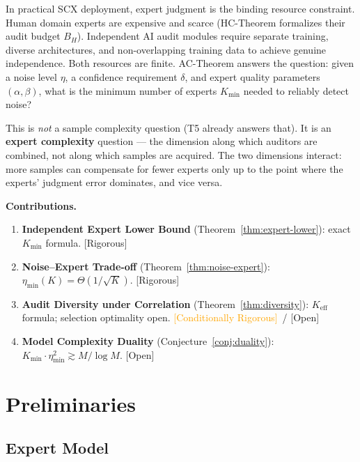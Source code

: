 \documentclass[12pt,a4paper]{article}
\newcommand{\rigorous}{\textcolor{green!50!black}{\small\textsf{[Rigorous]}}}
\newcommand{\conditionallyrigorous}{\textcolor{orange}{\small\textsf{[Conditionally Rigorous]}}}
\newcommand{\openquest}{\textcolor{red!70!black}{\small\textsf{[Open]}}}
\begin{document}
In practical SCX deployment, expert judgment is the binding resource constraint.
Human domain experts are expensive and scarce (HC-Theorem formalizes their audit
budget $B_H$).  Independent AI audit modules require separate training, diverse
architectures, and non-overlapping training data to achieve genuine
independence.  Both resources are finite.  AC-Theorem answers the question: given
a noise level $\eta$, a confidence requirement $\delta$, and expert quality
parameters $(\alpha,\beta)$, what is the minimum number of experts $K_{\min}$
needed to reliably detect noise?

This is \emph{not} a sample complexity question (T5 already answers that).
It is an \textbf{expert complexity} question — the dimension along which
auditors are combined, not along which samples are acquired.  The two
dimensions interact: more samples can compensate for fewer experts only up
to the point where the experts' judgment error dominates, and vice versa.

\medskip\noindent
\textbf{Contributions.}
\begin{enumerate}[label=(\arabic*)]
    \item \textbf{Independent Expert Lower Bound}
          (Theorem~\ref{thm:expert-lower}): exact $K_{\min}$ formula.  \rigorous
    \item \textbf{Noise--Expert Trade-off}
          (Theorem~\ref{thm:noise-expert}): $\eta_{\min}(K)=\Theta(1/\sqrt{K})$.
          \rigorous
    \item \textbf{Audit Diversity under Correlation}
          (Theorem~\ref{thm:diversity}): $K_{\mathrm{eff}}$ formula; selection
          optimality open.  \conditionallyrigorous~/ \openquest
    \item \textbf{Model Complexity Duality}
          (Conjecture~\ref{conj:duality}): $K_{\min}\cdot\eta_{\min}^2 \gtrsim M/\log M$.
          \openquest
\end{enumerate}

\section{Preliminaries}

\subsection{Expert Model}
\end{document}
